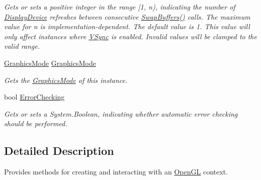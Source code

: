 \begin{DoxyCompactItemize}
\begin{DoxyCompactList}\small\item\em Gets or sets a positive integer in the range \mbox{[}1, n), indicating the number of \hyperlink{class_open_t_k_1_1_display_device}{Display\-Device} refreshes between consecutive \hyperlink{interface_open_t_k_1_1_graphics_1_1_i_graphics_context_ad7d516da745576542161f1baa5f20129}{Swap\-Buffers()} calls. The maximum value for n is implementation-\/dependent. The default value is 1. This value will only affect instances where \hyperlink{interface_open_t_k_1_1_graphics_1_1_i_graphics_context_ad02e5a60e13f6ed668b8075ead268cb6}{V\-Sync} is enabled. Invalid values will be clamped to the valid range. \end{DoxyCompactList}\item 
\hyperlink{class_open_t_k_1_1_graphics_1_1_graphics_mode}{Graphics\-Mode} \hyperlink{interface_open_t_k_1_1_graphics_1_1_i_graphics_context_a225502437befccb70af6444801d0654e}{Graphics\-Mode}
\begin{DoxyCompactList}\small\item\em Gets the \hyperlink{class_open_t_k_1_1_graphics_1_1_graphics_mode}{Graphics\-Mode} of this instance.\end{DoxyCompactList}\item 
bool \hyperlink{interface_open_t_k_1_1_graphics_1_1_i_graphics_context_ada0d1b90245fbb8eba94ef25072fe49c}{Error\-Checking}
\begin{DoxyCompactList}\small\item\em Gets or sets a System.\-Boolean, indicating whether automatic error checking should be performed. \end{DoxyCompactList}\end{DoxyCompactItemize}


\subsection{Detailed Description}
Provides methods for creating and interacting with an \hyperlink{namespace_open_t_k_1_1_graphics_1_1_open_g_l}{Open\-G\-L} context. 



